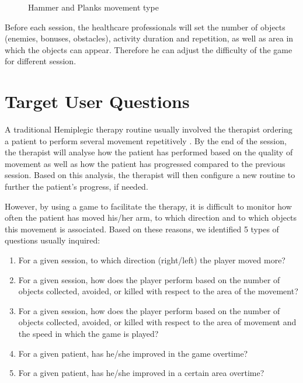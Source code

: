 
\begin{figure}%
    \centering
    \qquad
    \caption{Hammer and Planks movement type}%
    \label{fig:movement_type}%
\end{figure}


Before each session, the healthcare professionals will set the number of objects (enemies, bonuses, obstacles), activity duration and repetition, as well as area in which the objects can appear. Therefore he can adjust the difficulty of the game for different session.


\section{Target User Questions}

A traditional Hemiplegic therapy routine usually involved the therapist ordering a patient to perform several movement repetitively \cite{rahman}. By the end of the session, the therapist will analyse how the patient has performed based on the quality of movement as well as how the patient has progressed compared to the previous session. Based on this analysis, the therapist will then configure a new routine to further the patient's progress, if needed.

However, by using a game to facilitate the therapy, it is difficult to monitor how often the patient has moved his/her arm, to which direction and to which objects this movement is associated. Based on these reasons, we identified 5 types of questions usually inquired:

\newcommand{\subscript}[2]{$#1 _ #2$}	
\begin{enumerate}[label=(\subscript{Q}{\arabic*})]
\item For a given session, to which direction (right/left) the player moved more? \label{q1}
\item For a given session, how does the player perform based on the number of objects collected, avoided, or killed with respect to the area of the movement?\label{q2}
\item For a given session, how does the player perform based on the number of objects collected, avoided, or killed with respect to the area of movement and the speed in which the game is played?\label{q3}
\item For a given patient, has he/she improved in the game overtime?\label{q4}
\item For a given patient, has he/she improved in a certain area overtime?\label{q5}
\end{enumerate}

